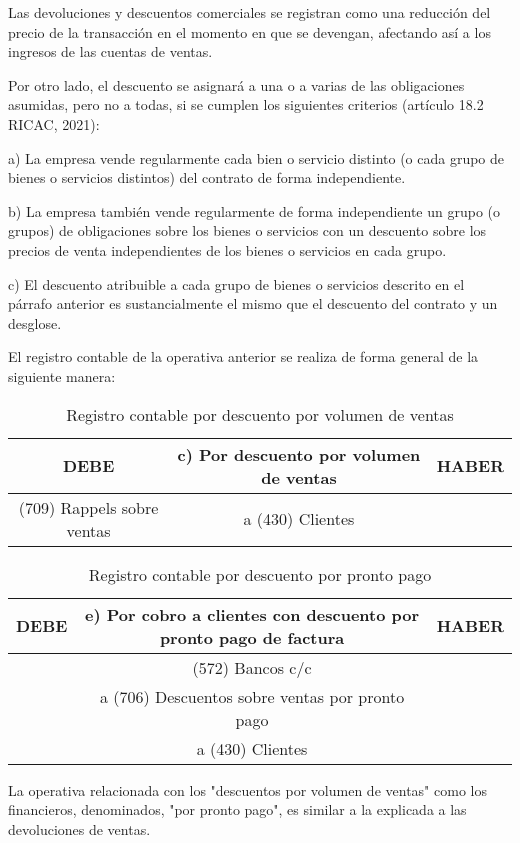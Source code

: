 \documentclass{article}
\begin{document}
Las devoluciones y descuentos comerciales se registran como una reducción del precio de la transacción en el momento en que se devengan, afectando así a los ingresos de las cuentas de ventas.

Por otro lado, el descuento se asignará a una o a varias de las obligaciones asumidas, pero no a todas, si se cumplen los siguientes criterios (artículo 18.2 RICAC, 2021):

a) La empresa vende regularmente cada bien o servicio distinto (o cada grupo de bienes o servicios distintos) del contrato de forma independiente.

b) La empresa también vende regularmente de forma independiente un grupo (o grupos) de obligaciones sobre los bienes o servicios con un descuento sobre los precios de venta independientes de los bienes o servicios en cada grupo.

c) El descuento atribuible a cada grupo de bienes o servicios descrito en el párrafo anterior es sustancialmente el mismo que el descuento del contrato y un desglose.

El registro contable de la operativa anterior se realiza de forma general de la siguiente manera:

\begin{table}[H]
\centering
\begin{tabular}{|c|c|c|}
\hline
\textbf{DEBE} & \textbf{c) Por descuento por volumen de ventas} & \textbf{HABER} \\
\hline
(709) Rappels sobre ventas & a (430) Clientes \\
\hline
\end{tabular}
\caption{Registro contable por descuento por volumen de ventas}
\end{table}

\begin{table}[H]
\centering
\begin{tabular}{|c|c|c|}
\hline
\textbf{DEBE} & \parbox{4cm}{\textbf{e) Por cobro a clientes con descuento por pronto pago de factura}} & \textbf{HABER} \\
\hline
 & (572) Bancos c/c &  \\
 & a (706) Descuentos sobre ventas por pronto pago & \\
 & a (430) Clientes & \\
\hline
\end{tabular}
\caption{Registro contable por descuento por pronto pago}
\end{table}

La operativa relacionada con los "descuentos por volumen de ventas" como los financieros, denominados, "por pronto pago", es similar a la explicada a las devoluciones de ventas.
\end{document}
